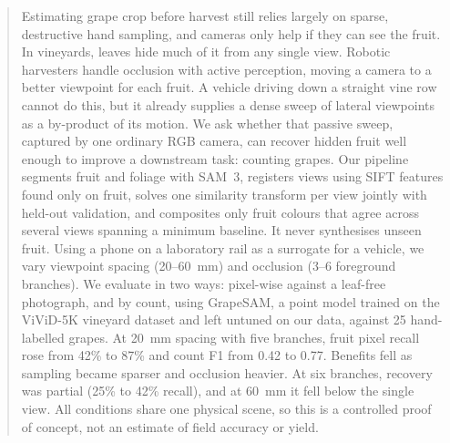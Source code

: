 \begin{abstract}
Estimating grape crop before harvest still relies largely on sparse, destructive hand sampling, and cameras only help if they can see the fruit. In vineyards, leaves hide much of it from any single view. Robotic harvesters handle occlusion with active perception, moving a camera to a better viewpoint for each fruit. A vehicle driving down a straight vine row cannot do this, but it already supplies a dense sweep of lateral viewpoints as a by-product of its motion. We ask whether that passive sweep, captured by one ordinary RGB camera, can recover hidden fruit well enough to improve a downstream task: counting grapes. Our pipeline segments fruit and foliage with SAM~3, registers views using SIFT features found only on fruit, solves one similarity transform per view jointly with held-out validation, and composites only fruit colours that agree across several views spanning a minimum baseline. It never synthesises unseen fruit. Using a phone on a laboratory rail as a surrogate for a vehicle, we vary viewpoint spacing (20--60~mm) and occlusion (3--6 foreground branches). We evaluate in two ways: pixel-wise against a leaf-free photograph, and by count, using GrapeSAM, a point model trained on the ViViD-5K vineyard dataset and left untuned on our data, against 25 hand-labelled grapes. At 20~mm spacing with five branches, fruit pixel recall rose from 42\% to 87\% and count F1 from 0.42 to 0.77. Benefits fell as sampling became sparser and occlusion heavier. At six branches, recovery was partial (25\% to 42\% recall), and at 60~mm it fell below the single view. All conditions share one physical scene, so this is a controlled proof of concept, not an estimate of field accuracy or yield.
\end{abstract}